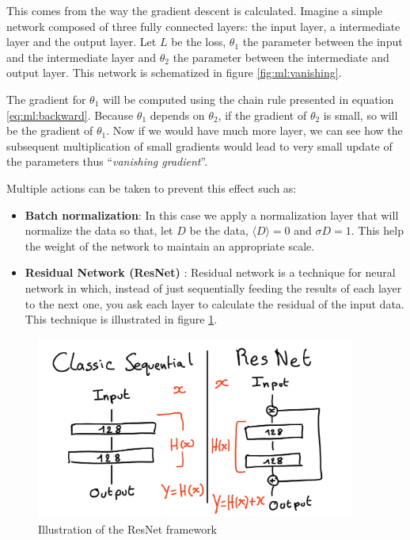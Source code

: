 \documentclass[../main.tex]{subfiles}
\begin{document}
This comes from the way the gradient descent is calculated. Imagine a simple network composed of three fully connected layers: the input layer, a intermediate layer and the output layer. Let $L$ be the loss, $\theta_1$ the parameter between the input and the intermediate layer and $\theta_2$ the parameter between the intermediate and output layer. This network is schematized in figure \ref{fig:ml:vanishing}.

The gradient for $\theta_1$ will be computed using the chain rule presented in equation \ref{eq:ml:backward}. Because $\theta_1$ depends on $\theta_2$, if the gradient of $\theta_2$ is small, so will be the gradient of $\theta_1$. Now if we would have much more layer, we can see how the subsequent multiplication of small gradients would lead to very small update of the parameters thus ``\textit{vanishing gradient}''.

Multiple actions can be taken to prevent this effect such as:
\begin{itemize}
  \item \textbf{Batch normalization}: In this case we apply a normalization layer that will normalize the data so that, let $D$ be the data, $\langle D \rangle = 0$ and $\sigma D = 1$. This help the weight of the network to maintain an appropriate scale.
  \item \textbf{Residual Network (ResNet)} \cite{he_deep_2016}: Residual network is a technique for neural network in which, instead of just sequentially feeding the results of each layer to the next one, you ask each layer to calculate the residual of the input data. This technique is illustrated in figure \ref{fig:ml:resnet}. 
\end{itemize}


\begin{figure}
  \centering
  \includegraphics[height=6cm]{images/ml/resnet.jpg}
  \caption{Illustration of the ResNet framework}
  \label{fig:ml:resnet}
\end{figure}
\end{document}
